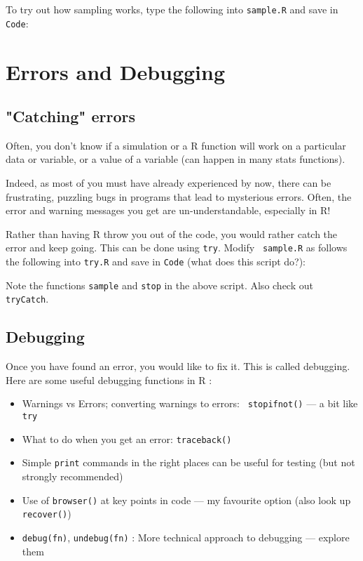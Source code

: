 To try out how sampling works, type the following into {\tt sample.R} 
and save in {\tt Code}:



\section{Errors and Debugging}

\subsection{"Catching" errors}

Often, you don't know if a simulation or a R function will work on a 
particular data or variable, or a value of a variable (can happen in 
many stats functions). 

Indeed, as most of you must have already experienced by now, there can 
be frustrating, puzzling bugs in programs that lead to mysterious 
errors. Often, the error and warning messages you get are 
un-understandable, especially in R! 

Rather than having R throw you out of the code, you would rather catch 
the error and keep going. This can be done using {\tt try}. Modify {\tt 
sample.R} as follows the 
following into {\tt try.R} and save in {\tt Code} (what does this 
script do?):



Note the functions {\tt sample} and {\tt stop} in the above script.  
Also check out {\tt tryCatch}.

\subsection{Debugging}

Once you have found an error, you would like to fix it. This is called 
debugging. Here are some useful debugging functions in R : 

\begin{itemize}\itemsep2pt

\item Warnings vs Errors; converting warnings to errors: {\tt 
stopifnot()} --- a bit like {\tt try}

\item What to do when you get an error: {\tt traceback()}

\item Simple {\tt print} commands in the right places can be useful 
for testing (but not strongly recommended)

\item Use of {\tt browser()} at key points in code --- my favourite option 
(also look up  {\tt recover()})

\item {\tt debug(fn)}, {\tt undebug(fn)} : More technical approach to 
debugging --- explore them
\end{itemize}

